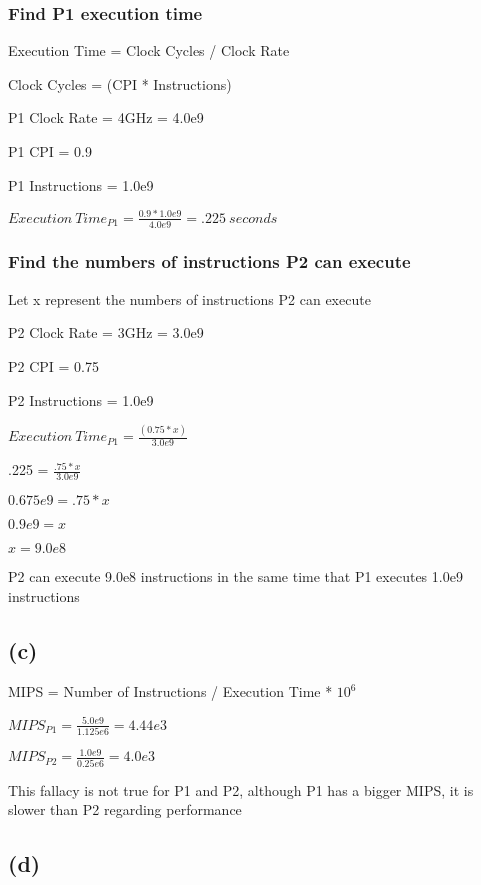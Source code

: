 \documentclass{article}
\begin{document}
    \subsubsection*{Find P1 execution time}

    Execution Time = Clock Cycles / Clock Rate

    Clock Cycles = (CPI * Instructions)

    P1 Clock Rate = 4GHz = 4.0e9
    
    P1 CPI = 0.9

    P1 Instructions = 1.0e9

    \vspace*{6pt}

    $Execution\ Time_{P1} = \frac{0.9 * 1.0e9}{4.0e9} = .225\ seconds$

    \subsubsection*{Find the numbers of instructions P2 can execute}

    Let x represent the numbers of instructions P2 can execute

    P2 Clock Rate = 3GHz = 3.0e9
    
    P2 CPI = 0.75

    P2 Instructions = 1.0e9
    \vspace*{6pt}

    $Execution\ Time_{P1} = \frac{(0.75 * x)}{3.0e9}$

    .225 = $\frac{.75*x}{3.0e9}$

    $0.675e9 = .75 * x$

    $0.9e9 = x$

    $x = 9.0e8$

    P2 can execute 9.0e8 instructions in the same time that P1 executes 1.0e9 instructions

    \subsection*{(c)}

    MIPS = Number of Instructions / Execution Time * $10^6$

    $MIPS_{P1} = \frac{5.0e9}{1.125e6} = 4.44e3$

    $MIPS_{P2} = \frac{1.0e9}{0.25e6} = 4.0e3$

    This fallacy is not true for P1 and P2, although P1 has a bigger MIPS, it is slower than P2 regarding performance
    \subsection*{(d)}
\end{document}
